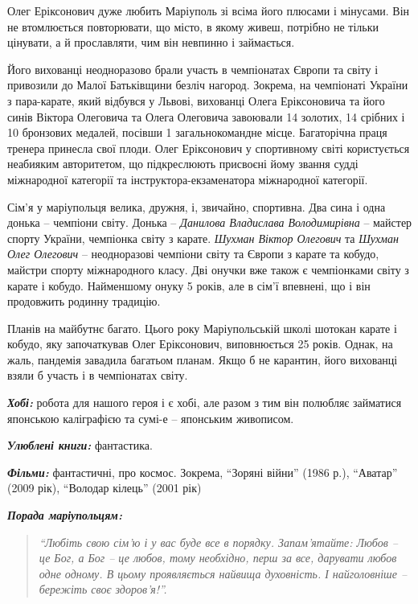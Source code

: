 Олег Еріксонович дуже любить Маріуполь зі всіма його плюсами і мінусами. Він не
втомлюється повторювати, що місто, в якому живеш, потрібно не тільки цінувати,
а й прославляти, чим він невпинно і займається.


Його вихованці неодноразово брали участь в чемпіонатах Європи та світу і
привозили до Малої Батьківщини безліч нагород. Зокрема, на чемпіонаті України з
пара-карате, який відбувся у Львові, вихованці Олега Еріксоновича та його синів
Віктора Олеговича та Олега Олеговича завоювали 14 золотих, 14 срібних і 10
бронзових медалей, посівши 1 загальнокомандне місце.  Багаторічна праця тренера
принесла свої плоди. Олег Еріксонович у спортивному світі користується
неабияким авторитетом, що підкреслюють присвоєні йому звання судді міжнародної
категорії та інструктора-екзаменатора міжнародної категорії.

Сім'я у маріупольця велика, дружня, і, звичайно, спортивна. Два сина і одна
донька – чемпіони світу. Донька – \emph{Данилова Владислава Володимирівна} – майстер
спорту України, чемпіонка світу з карате. \emph{Шухман Віктор Олегович} та \emph{Шухман Олег
Олегович} – неодноразові чемпіони світу та Європи з карате та кобудо, майстри
спорту міжнародного класу. Дві онучки вже також є чемпіонками світу з карате і
кобудо. Найменшому онуку 5 років, але в сім'ї впевнені, що і він продовжить
родинну традицію.


Планів на майбутнє багато. Цього року Маріупольській школі шотокан карате і
кобудо, яку започаткував Олег Еріксонович, виповнюється 25 років. Однак, на
жаль, пандемія завадила багатьом планам. Якщо б не карантин, його вихованці
взяли б участь і в чемпіонатах світу.


\emph{\textbf{Хобі:}} робота для нашого героя і є хобі, але разом з тим він полюбляє займатися японською каліграфією та сумі-е – японським живописом.

\emph{\textbf{Улюблені книги:}} фантастика.

\emph{\textbf{Фільми:}} фантастичні, про космос. Зокрема, \enquote{Зоряні війни} (1986 р.), \enquote{Аватар} (2009 рік), \enquote{Володар кілець} (2001 рік)

\emph{\textbf{Порада маріупольцям:}} 

\begin{quote}
\em \enquote{Любіть свою сім'ю і у вас буде все в порядку. Запам'ятайте: Любов – це Бог, а
Бог – це любов, тому необхідно, перш за все, дарувати любов одне одному. В
цьому проявляється найвища духовність. І найголовніше – бережіть своє
здоров'я!}.
\end{quote}
